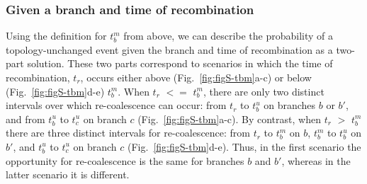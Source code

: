 \documentclass[11pt]{article}
\begin{document}
\subsubsection{Given a branch and time of recombination}
Using the definition for $t_b^m$ from above, we can describe the probability
of a topology-unchanged event given the branch and time of recombination
as a two-part solution. These two parts correspond to scenarios in which
the time of recombination, $t_r$, occurs either above (Fig.~\ref{fig:figS-tbm}a-c)
or below (Fig.~\ref{fig:figS-tbm}d-e) $t_b^m$. When $t_r$ $<=$ $t_b^m$, there
are only two distinct intervals over which re-coalescence can occur: from
$t_r$ to $t_b^u$ on branches $b$ or $b'$, and from $t_b^u$ to $t_c^u$ on 
branch $c$ (Fig.~\ref{fig:figS-tbm}a-c). By contrast, when $t_r$ $>$ $t_b^m$
there are three distinct intervals for re-coalescence: from $t_r$ to $t_b^m$
on $b$, $t_b^m$ to $t_b^u$ on $b'$, and $t_b^u$ to $t_c^u$ on 
branch $c$ (Fig.~\ref{fig:figS-tbm}d-e). Thus, in the first scenario 
the opportunity for re-coalescence is the same for branches $b$ 
and $b'$, whereas in the latter scenario it is different.

\end{document}
